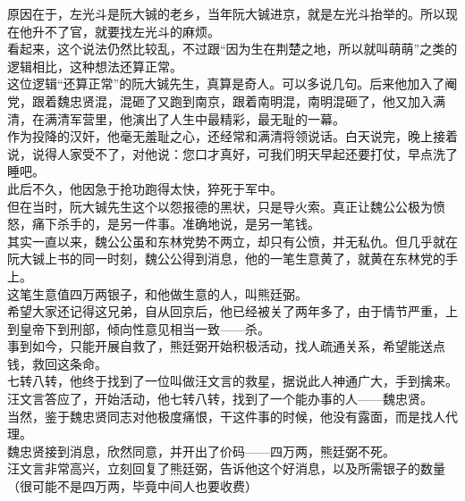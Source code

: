 \begin{multicols}{\theparacolNo}
原因在于，左光斗是阮大铖的老乡，当年阮大铖进京，就是左光斗抬举的。所以现在他升不了官，就要找左光斗的麻烦。\\

看起来，这个说法仍然比较乱，不过跟“因为生在荆楚之地，所以就叫萌萌”之类的逻辑相比，这种想法还算正常。\\

这位逻辑“还算正常”的阮大铖先生，真算是奇人。可以多说几句。后来他加入了阉党，跟着魏忠贤混，混砸了又跑到南京，跟着南明混，南明混砸了，他又加入满清，在满清军营里，他演出了人生中最精彩，最无耻的一幕。\\

作为投降的汉奸，他毫无羞耻之心，还经常和满清将领说话。白天说完，晚上接着说，说得人家受不了，对他说：您口才真好，可我们明天早起还要打仗，早点洗了睡吧。\\

此后不久，他因急于抢功跑得太快，猝死于军中。\\

但在当时，阮大铖先生这个以怨报德的黑状，只是导火索。真正让魏公公极为愤怒，痛下杀手的，是另一件事。准确地说，是另一笔钱。\\

其实一直以来，魏公公虽和东林党势不两立，却只有公愤，并无私仇。但几乎就在阮大铖上书的同一时刻，魏公公得到消息，他的一笔生意黄了，就黄在东林党的手上。\\

这笔生意值四万两银子，和他做生意的人，叫熊廷弼。\\

希望大家还记得这兄弟，自从回京后，他已经被关了两年多了，由于情节严重，上到皇帝下到刑部，倾向性意见相当一致——杀。\\

事到如今，只能开展自救了，熊廷弼开始积极活动，找人疏通关系，希望能送点钱，救回这条命。\\

七转八转，他终于找到了一位叫做汪文言的救星，据说此人神通广大，手到擒来。\\

汪文言答应了，开始活动，他七转八转，找到了一个能办事的人——魏忠贤。\\

当然，鉴于魏忠贤同志对他极度痛恨，干这件事的时候，他没有露面，而是找人代理。\\

魏忠贤接到消息，欣然同意，并开出了价码——四万两，熊廷弼不死。\\

汪文言非常高兴，立刻回复了熊廷弼，告诉他这个好消息，以及所需银子的数量（很可能不是四万两，毕竟中间人也要收费）\\


\end{multicols}
